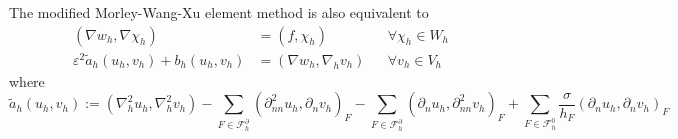 \documentclass[11pt]{article}
\begin{document}
    The modified Morley-Wang-Xu element method is also equivalent to \[
\begin{aligned}
\left(\nabla w_{h}, \nabla \chi_{h}\right) &=\left(f, \chi_{h}\right) & & \forall \chi_{h} \in W_{h} \\
\varepsilon^{2} \tilde{a}_{h}\left(u_{h}, v_{h}\right)+b_{h}\left(u_{h}, v_{h}\right) &=\left(\nabla w_{h}, \nabla_{h} v_{h}\right) & & \forall v_{h} \in V_{h}
\end{aligned}
\] where \[
\tilde{a}_{h}\left(u_{h}, v_{h}\right):=\left(\nabla_{h}^{2} u_{h}, \nabla_{h}^{2} v_{h}\right)-\sum_{F \in \mathcal{F}_{h}^{\partial}}\left(\partial_{n n}^{2} u_{h}, \partial_{n} v_{h}\right)_{F}-\sum_{F \in \mathcal{F}_{h}^{\partial}}\left(\partial_{n} u_{h}, \partial_{n n}^{2} v_{h}\right)_{F}+\sum_{F \in \mathcal{F}_{h}^{0}} \frac{\sigma}{h_{F}}\left(\partial_{n} u_{h}, \partial_{n} v_{h}\right)_{F}
\]

    
    
    
\end{document}

